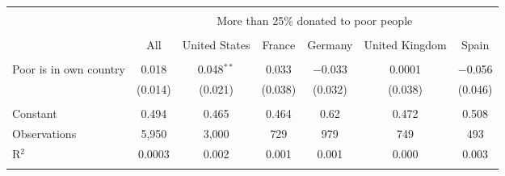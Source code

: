 
\begin{tabular}{@{\extracolsep{5pt}}lcccccc} 
\\[-1.8ex]\hline 
\hline \\[-1.8ex] 
 & \multicolumn{6}{c}{More than 25\% donated to poor people} \\ 
\cline{2-7} 
\\[-1.8ex] & All & United States & France & Germany & United Kingdom & Spain \\ 
\hline \\[-1.8ex] 
 Poor is in own country & 0.018 & 0.048$^{**}$ & 0.033 & $-$0.033 & 0.0001 & $-$0.056 \\ 
  & (0.014) & (0.021) & (0.038) & (0.032) & (0.038) & (0.046) \\ 
 \hline \\[-1.8ex] 
Constant & 0.494 & 0.465 & 0.464 & 0.62 & 0.472 & 0.508 \\ 
Observations & 5,950 & 3,000 & 729 & 979 & 749 & 493 \\ 
R$^{2}$ & 0.0003 & 0.002 & 0.001 & 0.001 & 0.000 & 0.003 \\ 
\hline 
\hline \\[-1.8ex] 
\end{tabular} 